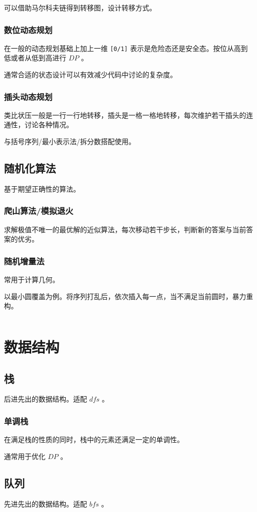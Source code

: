 \documentclass[UTF-8]{ctexart}
\newcommand{\cpp}[1]{\inputminted[bgcolor=bg,breaklines,breakanywhere=true]{c++}{#1}}
\begin{document}
			可以借助马尔科夫链得到转移图，设计转移方式。
			\subsubsection{数位动态规划}
			在一般的动态规划基础上加上一维 \texttt{[0/1]} 表示是危险态还是安全态。按位从高到低或者从低到高进行 $DP$ 。
	
			通常合适的状态设计可以有效减少代码中讨论的复杂度。
			\subsubsection{插头动态规划}
			类比状压一般是一行一行地转移，插头是一格一格地转移，每次维护若干插头的连通性，讨论各种情况。
	
			与括号序列/最小表示法/拆分数搭配使用。
		\subsection{随机化算法}
		基于期望正确性的算法。
			\subsubsection{爬山算法/模拟退火}
			求解极值不唯一的最优解的近似算法，每次移动若干步长，判断新的答案与当前答案的优劣。
			\subsubsection{随机增量法}
			常用于计算几何。
	
			以最小圆覆盖为例。将序列打乱后，依次插入每一点，当不满足当前圆时，暴力重构。
			\cpp{code//Example//BZOJ1337.cpp}
	\newpage
	\section{数据结构}
		\subsection{栈}
		后进先出的数据结构。适配 $dfs$ 。
			\subsubsection{单调栈}
			在满足栈的性质的同时，栈中的元素还满足一定的单调性。
		
			通常用于优化 $DP$ 。
		\subsection{队列}
		先进先出的数据结构。适配 $bfs$ 。
\end{document}

